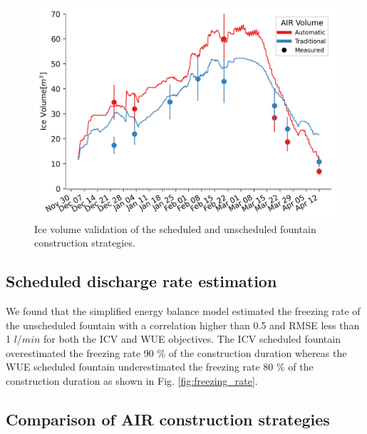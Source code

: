 \documentclass[tc, manuscript]{copernicus}
\begin{document}
\begin{figure}[t] 
  \includegraphics[width=12cm]{Figures/validation.png} 
  \caption{Ice volume validation of the scheduled and unscheduled fountain construction strategies.} 
\label{fig:validation} 
\end{figure}

\subsection{Scheduled discharge rate estimation}

We found that the simplified energy balance model estimated the freezing rate of the unscheduled fountain with a correlation higher than 0.5 and RMSE less than 1 $l/min$ for both the ICV and WUE objectives. The ICV scheduled fountain overestimated the freezing rate 90 \% of the construction duration whereas the WUE
scheduled fountain underestimated the freezing rate 80 \% of the construction duration as shown in Fig.
\ref{fig:freezing_rate}.


\subsection{Comparison of AIR construction strategies}
\end{document}

